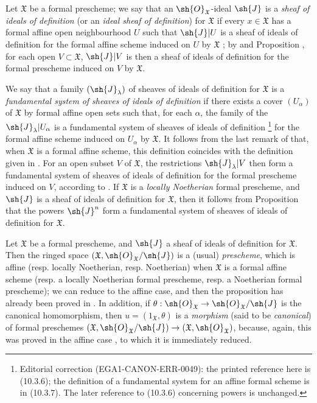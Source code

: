 \begin{env}[10.5.1]
\label{I.10.5.1}
Let $\mathfrak{X}$ be a formal prescheme; we say that an $\sh{O}_\mathfrak{X}$-ideal $\sh{J}$ is a \emph{sheaf of ideals of definition} (or an \emph{ideal sheaf of definition}) for $\mathfrak{X}$ if every $x\in\mathfrak{X}$ has a formal affine open neighbourhood $U$ such that $\sh{J}|U$ is a sheaf of ideals of definition for the formal affine scheme induced on $U$ by $\mathfrak{X}$ ; by  and Proposition , for each open $V\subset\mathfrak{X}$, $\sh{J}|V$ is then a sheaf of ideals of definition for the formal prescheme induced on $V$ by $\mathfrak{X}$.

We say that a family $(\sh{J}_\lambda)$ of sheaves of ideals of definition for $\mathfrak{X}$ is a \emph{fundamental system}
\emph{of sheaves of ideals of definition} if there exists a cover $(U_\alpha)$ of $\mathfrak{X}$ by formal affine open sets such that, for each $\alpha$, the family of the $\sh{J}_\lambda|U_\alpha$ is a fundamental system of sheaves of ideals of definition \footnote{Editorial correction (EGA1-CANON-ERR-0049): the printed reference here is (10.3.6); the definition of a fundamental system for an affine formal scheme is in (10.3.7). The later reference to (10.3.6) concerning powers is unchanged.} for the formal affine scheme induced on $U_\alpha$ by $\mathfrak{X}$.
It follows from the last remark of  that, when $\mathfrak{X}$ is a formal affine scheme, this definition coincides with the definition given in .
For an open subset $V$ of $\mathfrak{X}$, the restrictions $\sh{J}_\lambda|V$ then form a fundamental system of sheaves of ideals of definition for the formal prescheme induced on $V$, according to .
If $\mathfrak{X}$ is a \emph{locally Noetherian} formal prescheme, and $\sh{J}$ is a sheaf of ideals of definition for $\mathfrak{X}$, then it follows from Proposition  that the powers $\sh{J}^n$ form a fundamental system of sheaves of ideals of definition for $\mathfrak{X}$.
\end{env}

\begin{env}[10.5.2]
\label{I.10.5.2}
Let $\mathfrak{X}$ be a formal prescheme, and $\sh{J}$ a sheaf of ideals of definition for $\mathfrak{X}$.
Then the ringed space $(\mathfrak{X},\sh{O}_\mathfrak{X}/\sh{J})$ is a (usual) \emph{prescheme}, which is affine (resp. locally Noetherian, resp. Noetherian) when $\mathfrak{X}$ is a formal affine scheme (resp. a locally Noetherian formal prescheme, resp. a Noetherian formal prescheme);  we can reduce to the affine case, and then the proposition has already been proved in .
In addition, if $\theta:\sh{O}_\mathfrak{X}\to\sh{O}_\mathfrak{X}/\sh{J}$ is the canonical homomorphism, then $u=(1_\mathfrak{X},\theta)$ is a \emph{morphism} (said to be \emph{canonical}) of formal preschemes $(\mathfrak{X},\sh{O}_\mathfrak{X}/\sh{J})\to(\mathfrak{X},\sh{O}_\mathfrak{X})$, because, again, this was proved in the affine case , to which it is immediately reduced.
\end{env}

